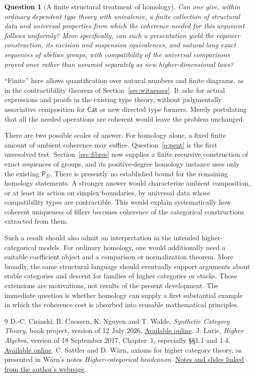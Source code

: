 \documentclass[11pt,a4paper]{amsart}
\newtheorem{question}[proposition]{Question}
\theoremstyle{definition}
\newcommand{\Cat}{\mathsf{Cat}}
\newcommand{\PD}{\mathsf P_D}
\begin{document}
\begin{question}[A finite structural treatment of homology]
Can one give, within ordinary dependent type theory with univalence, a
finite collection of structural data and universal properties from
which the coherence needed for this argument follows uniformly?
More specifically, can such a presentation yield the copower
construction, its excision and suspension equivalences, and natural long
exact sequences of abelian groups, with compatibility of the universal
comparisons proved once rather than assumed separately as new
higher-dimensional laws?
\end{question}

``Finite'' here allows quantification over natural numbers and finite
diagrams, as in the contractibility theorem of Section~\ref{sec:witnesses}.
It asks for actual expressions and proofs in the existing type theory,
without judgmentally associative composition for $\Cat$ or new directed
type formers. Merely postulating that all the needed operations are
coherent would leave the problem unchanged.

There are two possible scales of answer. For homology alone, a fixed
finite amount of ambient coherence may suffice. Question~\ref{q:pent}
is the first unresolved test. Section~\ref{sec:fibres} now supplies a
finite recursive construction of exact sequences of groups, and its
positive-degree homology instance uses only the existing $\PD$.
There is presently no established bound for the
remaining homology statements. A stronger answer would characterize
ambient composition, or at least its action on simplex boundaries, by
universal data whose compatibility types are contractible. This would
explain systematically how coherent uniqueness of fillers becomes
coherence of the categorical constructions extracted from them.

Such a result should also admit an interpretation in the intended
higher-categorical models. For ordinary homology, one would additionally
need a suitable coefficient object and a comparison or normalization
theorem. More broadly, the same structural language should eventually
support arguments about stable categories and descent for families of
higher categories or stacks. Those extensions are motivations, not
results of the present development. The immediate question is whether
homology can supply a first substantial example in which the coherence
cost is absorbed into reusable mathematical principles.

\begin{thebibliography}{9}
D.-C. Cisinski, B. Cnossen, K. Nguyen and T. Walde,
\emph{Synthetic Category Theory}, book project, version of 12 July 2026.
\href{https://bastiaancnossen.com/books/synthetic-category-theory.pdf}{Available online}.
J. Lurie, \emph{Higher Algebra}, version of 18 September 2017,
Chapter~1, especially \S\S1.1 and 1.4.
\href{https://www.math.ias.edu/~lurie/papers/HA.pdf}{Available online}.
C. Sattler and D. W\"arn, axioms for higher category theory,
as presented in W\"arn's notes \emph{Higher-categorical headcanon}.
\href{https://dwarn.se/}{Notes and slides linked from the author's webpage}.
\end{thebibliography}
\end{document}

